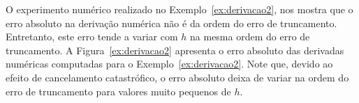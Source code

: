 \begin{obs}
  O experimento numérico realizado no Exemplo~\ref{ex:derivacao2}, nos mostra que o erro absoluto na derivação numérica não é da ordem do erro de truncamento. Entretanto, este erro tende a variar com $h$ na mesma ordem do erro de truncamento. A Figura~\ref{ex:derivacao2} apresenta o erro absoluto das derivadas numéricas computadas para o Exemplo~\ref{ex:derivacao2}. Note que, devido ao efeito de cancelamento catastrófico, o erro absoluto deixa de variar na ordem do erro de truncamento para valores muito pequenos de $h$.
\end{obs}



